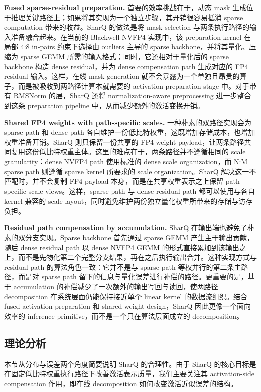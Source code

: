 \documentclass{article}
\begin{document}
\textbf{Fused sparse-residual preparation.}
首要的效率挑战在于，动态 mask 生成位于推理关键路径上；如果将其实现为一个独立步骤，其开销很容易抵消 sparse
computation 带来的收益。SharQ 的做法是将 mask selection 与两条执行路径的输入准备融合起来。在当前的
Blackwell NVFP4 实现中，该 preparation kernel 在局部 4:8 in-pairs 约束下选择由
outliers 主导的 sparse backbone，并将其量化、压缩为 sparse GEMM 所需的输入格式；同时，它还相对于量化后的
sparse backbone 构造 dense residual，并为 dense compensation path 生成对应的 FP4 residual
输入。这样，在线 mask generation 就不会暴露为一个单独且昂贵的算子，而是被吸收到两路径计算本就需要的 activation
preparation stage 中。对于带有 RMSNorm 的层，SharQ 还将 normalization-aware preprocessing
进一步整合到这条 preparation pipeline 中，从而减少额外的激活变换开销。

\textbf{Shared FP4 weights with path-specific scales.}
一种朴素的双路径实现会为 sparse path 和 dense path 各自维护一份低比特权重，这既增加存储成本，也增加权重准备开销。SharQ
则只保留一份共享的 FP4 weight payload，让两条路径共同复用这份低比特权重主体。这里的难点在于，两条路径并不遵循相同的
scale granularity：dense NVFP4 path 使用标准的 dense scale organization，而 N:M sparse
path 则遵循 sparse kernel 所要求的 scale organization。SharQ 解决这一不匹配时，并不会复制 FP4 payload
本身，而是在共享权重表示之上保留 path-specific scale views。这样，sparse path 与 dense residual
path 都可以使用与各自 kernel 兼容的 scale layout，同时避免维护两份独立量化权重所带来的存储与访存负担。

\textbf{Residual path compensation by accumulation.}
SharQ 在输出端也避免了朴素的双分支实现。Sparse backbone 首先通过 sparse GEMM 产生主干输出贡献，随后
dense residual path 以 dense NVFP4 GEMM 的形式直接累加到该输出之上，而不是先物化第二个完整分支结果，再在之后执行输出合并。这种实现方式与 residual
path 的算法角色一致：它并不是与 sparse path 等权并行的第二条主路径，而是对 sparse path 留下的信息与量化误差进行补偿的路径。更重要的是，基于
accumulation 的补偿减少了一次额外的输出写回与读回，使两路径 decomposition 在系统层面仍能保持接近单个 linear
kernel 的数据流组织。结合 fused activation preparation 和 shared-weight design，SharQ
因此更像一个面向效率的 inference primitive，而不是一个只在算法层面成立的 decomposition。

\subsection{理论分析}

本节从分布与误差两个角度简要说明 SharQ 的合理性。由于 SharQ 的核心目标是在固定低比特权重执行路径下改善激活表示质量，我们主要关注其
activation-side compensation 作用，即在线 decomposition 如何改变激活近似误差的结构。
\end{document}
